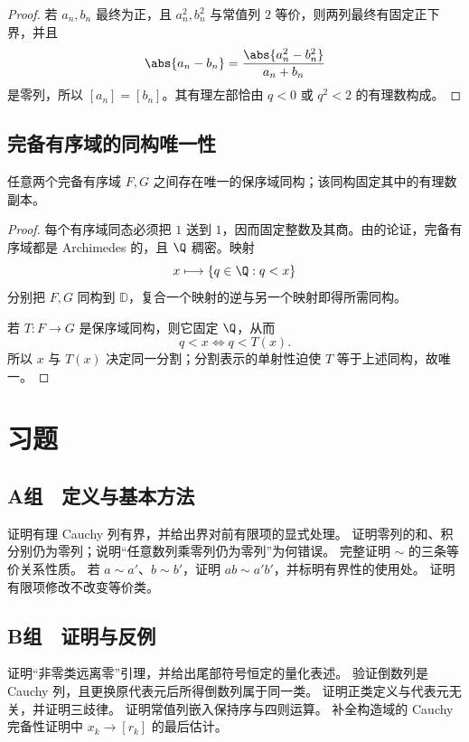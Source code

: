 \begin{proof}
若 \(a_n,b_n\) 最终为正，且 \(a_n^2,b_n^2\) 与常值列 \(2\) 等价，则两列最终有固定正下界，并且
\[
 \abs{a_n-b_n}
 =\frac{\abs{a_n^2-b_n^2}}{a_n+b_n}
\]
是零列，所以 \([a_n]=[b_n]\)。其有理左部恰由 \(q<0\) 或 \(q^2<2\) 的有理数构成。
\end{proof}

\subsection{完备有序域的同构唯一性}


\begin{theorem}
任意两个完备有序域 \(F,G\) 之间存在唯一的保序域同构；该同构固定其中的有理数副本。
\end{theorem}

\begin{proof}
每个有序域同态必须把 \(1\) 送到 \(1\)，因而固定整数及其商。由的论证，完备有序域都是 Archimedes 的，且 \(\Q\) 稠密。映射
\[
 x\longmapsto\{q\in\Q:q<x\}
\]
分别把 \(F,G\) 同构到 \(\mathbb D\)，复合一个映射的逆与另一个映射即得所需同构。

若 \(T:F\to G\) 是保序域同构，则它固定 \(\Q\)，从而
\[
 q<x\Longleftrightarrow q<T(x).
\]
所以 \(x\) 与 \(T(x)\) 决定同一分割；分割表示的单射性迫使 \(T\) 等于上述同构，故唯一。
\end{proof}

\section*{习题}

\subsection*{A组　定义与基本方法}
\begin{enumerate}[label=\textbf{\thechapter.\arabic*.}]
  证明有理 Cauchy 列有界，并给出界对前有限项的显式处理。
  证明零列的和、积分别仍为零列；说明“任意数列乘零列仍为零列”为何错误。
  完整证明 \(\sim\) 的三条等价关系性质。
  若 \(a\sim a'\)、\(b\sim b'\)，证明 \(ab\sim a'b'\)，并标明有界性的使用处。
  证明有限项修改不改变等价类。
\end{enumerate}

\subsection*{B组　证明与反例}
\begin{enumerate}[label=\textbf{\thechapter.\arabic*.},resume]
  证明“非零类远离零”引理，并给出尾部符号恒定的量化表述。
  验证倒数列是 Cauchy 列，且更换原代表元后所得倒数列属于同一类。
  证明正类定义与代表元无关，并证明三歧律。
  证明常值列嵌入保持序与四则运算。
  补全构造域的 Cauchy 完备性证明中 \(x_k\to[r_k]\) 的最后估计。
\end{enumerate}

